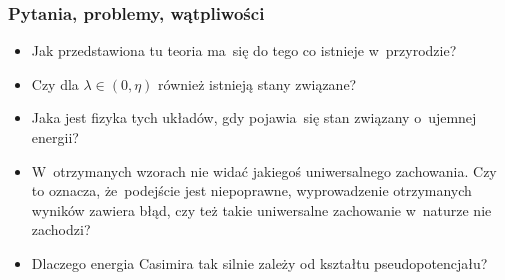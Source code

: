 \documentclass[10pt,t]{beamer}
\begin{document}
\begin{frame}
  \frametitle{Pytania, problemy, wątpliwości}


  \begin{itemize}
    \RaggedRight

  \item Jak przedstawiona tu teoria ma~się do tego co istnieje
    w~przyrodzie?

  \item Czy dla $\lambda \in ( 0, \eta )$ również istnieją stany związane?

  \item Jaka jest fizyka tych układów, gdy pojawia~się stan
    związany o~ujemnej energii?

  \item W~otrzymanych wzorach nie widać jakiegoś uniwersalnego
    zachowania. Czy to oznacza, że~podejście jest niepoprawne,
    wyprowadzenie otrzymanych wyników zawiera błąd, czy też
    takie uniwersalne zachowanie w~naturze nie
    zachodzi?

  \item Dlaczego energia Casimira tak silnie zależy od kształtu
    pseudopotencjału?

  \end{itemize}

\end{frame}










\appendix





\end{document}
